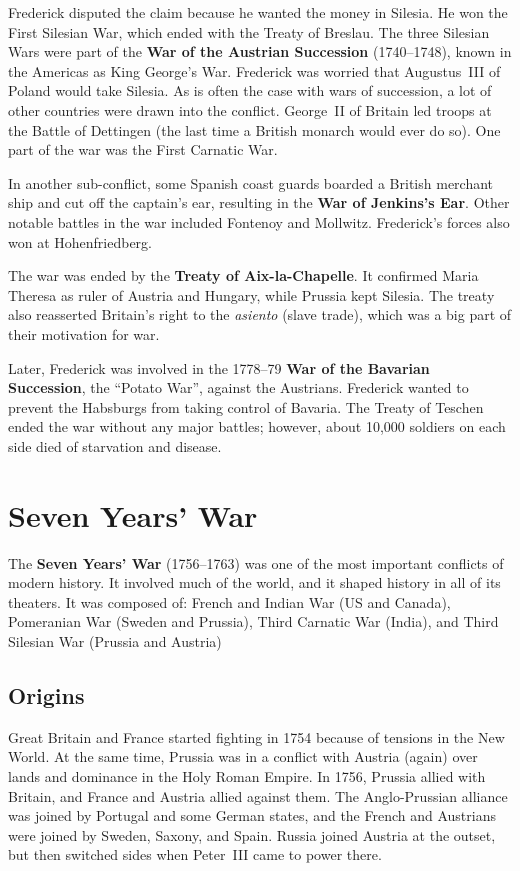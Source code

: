 Frederick disputed the claim because he wanted the money in Silesia.
He won the First Silesian War, which ended with the Treaty of Breslau.
The three Silesian Wars were part of the \textbf{War of the Austrian Succession} (1740--1748),
known in the Americas as King George's War.
Frederick was worried that Augustus~III of Poland would take Silesia.
As is often the case with wars of succession, a lot of other countries were drawn into the conflict.
George~II of Britain led troops at the Battle of Dettingen
(the last time a British monarch would ever do so).
One part of the war was the First Carnatic War.

In another sub-conflict,
some Spanish coast guards boarded a British merchant ship and cut off the captain's ear,
resulting in the \textbf{War of Jenkins's Ear}.
Other notable battles in the war included Fontenoy and Mollwitz.
Frederick's forces also won at Hohenfriedberg.

The war was ended by the \textbf{Treaty of Aix-la-Chapelle}.
It confirmed Maria Theresa as ruler of Austria and Hungary, while Prussia kept Silesia.
The treaty also reasserted Britain's right to the \textit{asiento} (slave trade),
which was a big part of their motivation for war.

Later, Frederick was involved in the 1778--79 \textbf{War of the Bavarian Succession},
the ``Potato War'', against the Austrians.
Frederick wanted to prevent the Habsburgs from taking control of Bavaria.
The Treaty of Teschen ended the war without any major battles;
however, about 10,000 soldiers on each side died of starvation and disease.

\section{Seven Years' War}

The \textbf{Seven Years' War} (1756--1763)
was one of the most important conflicts of modern history.
It involved much of the world, and it shaped history in all of its theaters.
It was composed of:
French and Indian War (US and Canada),
Pomeranian War (Sweden and Prussia),
Third Carnatic War (India),
and Third Silesian War (Prussia and Austria)

\subsection*{Origins}

Great Britain and France started fighting in 1754 because of tensions in the New World.
At the same time,
Prussia was in a conflict with Austria (again) over lands and dominance in the Holy Roman Empire.
In 1756, Prussia allied with Britain, and France and Austria allied against them.
The Anglo-Prussian alliance was joined by Portugal and some German states,
and the French and Austrians were joined by Sweden, Saxony, and Spain.
Russia joined Austria at the outset, but then switched sides when Peter~III came to power there.

